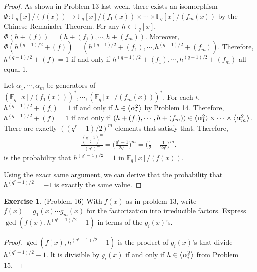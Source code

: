 \documentclass[12pt, psamsfonts]{amsart}
\theoremstyle{definition}
\newtheorem*{exer}{Exercise}
\theoremstyle{remark}
\numberwithin{equation}{section}
\begin{document}
\begin{proof}
  As shown in Problem 13 last week, there exists an isomorphism $\Phi: \mathbb{F}_q[x]/(f(x)) \rightarrow \mathbb{F}_q[x]/(f_1(x)) \times \cdots \times \mathbb{F}_q[x]/(f_m(x))$ by the Chinese Remainder Theorem.
  For any $h \in \mathbb{F}_q[x]$, $\Phi(h + (f)) = (h + (f_1), \cdots, h + (f_m))$.
  Moreover, $\Phi(h^{(q - 1)/2} + (f)) = (h^{(q - 1)/2} + (f_1), \cdots, h^{(q - 1)/2} + (f_m))$.
  Therefore, $h^{(q - 1)/2} + (f) = 1$ if and only if $h^{(q - 1)/2} + (f_1), \cdots, h^{(q - 1)/2} + (f_m)$ all equal 1.

  Let $\alpha_1, \cdots, \alpha_m$ be generators of $(\mathbb{F}_q[x]/(f_1(x)))^*, \cdots, (\mathbb{F}_q[x]/(f_m(x)))^*$.
  For each $i$, $h^{(q - 1)/2} + (f_i) = 1$ if and only if $h \in \ev{ \alpha_i^2 }$ by Problem 14.
  Therefore, $h^{(q - 1)/2} + (f) = 1$ if and only if $(h + (f_1), \cdots, h + (f_m)) \in \ev{ \alpha_1^2 } \times \cdots \times \ev{ \alpha_m^2 }$.
  There are exactly $((q^r - 1)/2)^m$ elements that satisfy that.
  Therefore,
  \begin{align*}
    \frac{(\frac{q^r - 1}{2})^m}{(q^r)^m} = \Big(\frac{q^r - 1}{2q^r}\Big)^m = \Big(\frac{1}{2} - \frac{1}{2q^r}\Big)^m.
  \end{align*}
  is the probability that $h^{(q^r - 1)/2} = 1$ in $\mathbb{F}_q[x]/(f(x))$.

  Using the exact same argument, we can derive that the probability that $h^{(q^r - 1)/2} = -1$ is exactly the same value.
\end{proof}

\begin{exer}{(Problem 16)}
  With $f(x)$ as in problem 13, write $f(x) = g_1(x) \cdots g_m(x)$ for the factorization into irreducible factors.
  Express $\gcd(f(x), h^{(q^r - 1)/2} - 1)$ in terms of the $g_i(x)$'s.
\end{exer}

\begin{proof}
  $\gcd(f(x), h^{(q^r - 1)/2} - 1)$ is the product of $g_i(x)$'s that divide $h^{(q^r - 1)/2} - 1$.
  It is divisible by $g_i(x)$ if and only if $h \in \ev{ \alpha_i^2 }$ from Problem 15.
\end{proof}
\end{document}

